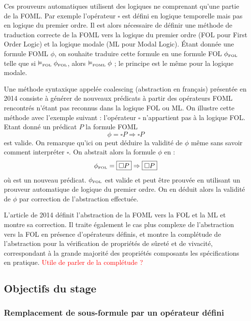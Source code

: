 \documentclass[12pt]{article}
\newcommand{\FOL}{\ensuremath{\textup{\tiny{}FOL}}}
\newcommand{\FOML}{\ensuremath{\textup{\tiny{}FOML}}}
\newcommand{\raph}[1]{\textcolor{red}{#1}}
\newcommand{\bpar}[1]{\marginpar{\color{myblue}\footnotesize\raggedright#1}}
\begin{document}
Ces prouveurs automatiques utilisent des logiques ne comprenant qu'une partie de la FOML.
Par exemple l'opérateur $\square$ est défini en logique temporelle mais pas en logique du premier ordre.
Il est alors nécessaire de définir une méthode de traduction correcte de la FOML vers la logique du premier ordre (FOL pour First Order Logic) et la logique modale (ML pour Modal Logic). %
Étant donnée une formule FOML $\phi$, on souhaite traduire cette formule en une formule FOL $\phi_\FOL$ telle que si $\vDash_\FOL \phi_\FOL$, alors $\vDash_\FOML \phi$ ; le principe est le même pour la logique modale.

Une méthode syntaxique appelée \og{}coalescing\fg{} (\og{}abstraction\fg{} en français) présentée en 2014 \cite{ARQNL2014} consiste à générer de nouveaux prédicats à partir des opérateurs FOML rencontrés n'étant pas reconnus dans la logique FOL ou ML.
On illustre cette méthode avec l'exemple suivant : l'opérateur $\square$ n'appartient pas à la logique FOL.
Etant donné un prédicat $P$ la formule FOML
\[ \phi = \square P \Rightarrow \square P \]
est valide.
On remarque qu'ici on peut déduire la validité de $\phi$ même sans savoir comment interpréter $\square$.
On abstrait alors la formule $\phi$ en :
\[ \phi_\FOL = \fbox{$\square P$} \Rightarrow \fbox{$\square P$} \]
où  est un nouveau prédicat.
$\phi_\FOL$ est valide et peut être prouvée en utilisant un prouveur automatique de logique du premier ordre.
On en déduit alors la validité de $\phi$ par correction de l'abstraction effectuée.

L'article de 2014 \cite{ARQNL2014} définit l'abstraction de la FOML vers la FOL et la ML et montre sa correction.
Il traite également le cas plus complexe de l'abstraction vers la FOL en présence d'opérateurs définis, et montre la complétude de l'abstraction pour la vérification de propriétés de {\color{myblue} sûreté} et \bpar{vraiment? sûreté seulement?} de vivacité, correspondant à la grande majorité des propriétés composants les spécifications en pratique. \raph{Utile de parler de la complétude ?} 

\subsection{Objectifs du stage}

\subsubsection{Remplacement de sous-formule par un opérateur défini}
\end{document}
